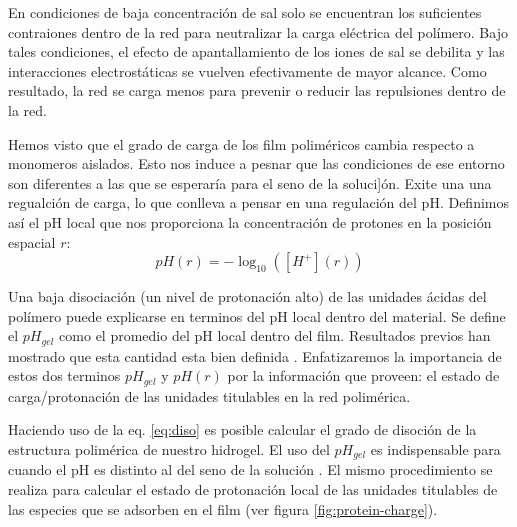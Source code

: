En condiciones de baja concentraci\'on de sal solo se encuentran los suficientes contraiones dentro de la red para neutralizar la carga el\'ectrica del pol\'imero. Bajo tales condiciones, el efecto de apantallamiento de los iones de sal se debilita y las interacciones electrost\'aticas se vuelven efectivamente de mayor alcance. Como resultado, la red se carga menos para prevenir o reducir las repulsiones dentro de la red.

Hemos visto que el grado de carga de los film polim\'ericos cambia respecto a monomeros aislados. Esto nos induce a pesnar que las condiciones de ese entorno son diferentes a las que se esperar\'ia para el seno de la soluci]\'on. Exite una una regualci\'on de carga, lo que conlleva a pensar en una regulaci\'on del pH.
Definimos as\'i el pH local que nos proporciona la concentraci\'on de protones  en la posición espacial $r$:
\begin{equation}
    pH(r) = -\log_{10}([H^+](r))
    \label{eq:pH-local}
\end{equation}

Una baja disociaci\'on (un nivel de protonaci\'on alto) de las unidades \'acidas del pol\'imero puede explicarse en terminos del pH local dentro del material. Se define el $pH_{gel}$ como el promedio del pH local dentro del film. Resultados previos han mostrado que esta cantidad esta bien definida \addcite. 
Enfatizaremos la importancia de estos dos terminos $pH_{gel}$ y $pH(r)$ por la informaci\'on que proveen: el estado de carga/protonaci\'on de las unidades titulables en la red polim\'erica. 

Haciendo uso de la eq. \ref{eq:diso} es posible calcular el grado de disoci\'on de la estructura polim\'erica de nuestro hidrogel. El uso del $pH_{gel}$ es indispensable para cuando el pH es distinto al  del seno de la soluci\'on \addcite. El mismo procedimiento se realiza para calcular el estado de protonaci\'on local de las unidades titulables de las especies que se adsorben en el film (ver figura \ref{fig:protein-charge}).

